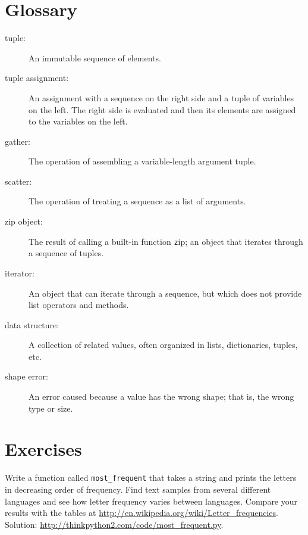 \documentclass[
DIV=11,
fontsize=13,
twoside,
headinclude=false,
titlepage=firstiscover,
abstract=true,
headsepline=true,
footsepline=true,
chapterprefix=true, %
headings=big,
bibliography=totoc,%
captions=tableheading
]{scrbook}
\theoremstyle{definition}
\begin{document}
\section{Glossary}

\begin{description}

\item[tuple:] An immutable sequence of elements.

\item[tuple assignment:] An assignment with a sequence on the
right side and a tuple of variables on the left.  The right
side is evaluated and then its elements are assigned to the
variables on the left.

\item[gather:] The operation of assembling a variable-length
argument tuple.

\item[scatter:] The operation of treating a sequence as a list of
arguments.

\item[zip object:] The result of calling a built-in function {\texttt zip};
an object that iterates through a sequence of tuples.

\item[iterator:] An object that can iterate through a sequence, but
which does not provide list operators and methods.

\item[data structure:] A collection of related values, often
organized in lists, dictionaries, tuples, etc.

\item[shape error:] An error caused because a value has the
wrong shape; that is, the wrong type or size.

\end{description}


\section{Exercises}

\begin{exercise}
\normalfont

Write a function called \verb"most_frequent" that takes a string and
prints the letters in decreasing order of frequency.  Find text
samples from several different languages and see how letter frequency
varies between languages.  Compare your results with the tables at
\url{http://en.wikipedia.org/wiki/Letter_frequencies}.  Solution:
\url{http://thinkpython2.com/code/most_frequent.py}.   

\end{exercise}
\end{document}
